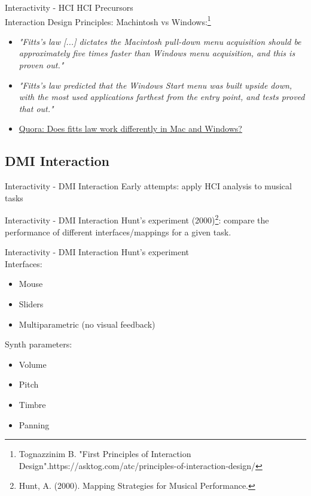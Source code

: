 \documentclass{beamer}
\begin{document}
\begin{frame}{Interactivity - HCI} 
    HCI Precursors\\
    \vspace{5mm}
    Interaction Design Principles: Machintosh vs Windows:\footnote{Tognazzinim B.  "First Principles of Interaction Design".https://asktog.com/atc/principles-of-interaction-design/}\\ 
    \begin{itemize}
        \item \textit{"Fitts’s law [...] dictates the Macintosh pull-down menu acquisition should be approximately five times faster than Windows menu acquisition, and this is proven out."}
        \item \textit{"Fitts’s law predicted that the Windows Start menu was built upside down, with the most used applications farthest from the entry point, and tests proved that out."} 
        \item \href{https://www.quora.com/Does-fitts-law-work-differently-in-Mac-and-Windows}{Quora: Does fitts law work differently in Mac and Windows?}
    \end{itemize}
\end{frame}


\subsection{DMI Interaction}

\begin{frame}{Interactivity - DMI Interaction} 
    Early attempts: apply HCI analysis to musical tasks\\
\end{frame}

\begin{frame}{Interactivity - DMI Interaction} 
    Hunt's experiment (2000)\footnote{Hunt, A. (2000). Mapping Strategies for Musical Performance.}: compare the performance of different interfaces/mappings for a given task.
\end{frame}

\begin{frame}{Interactivity - DMI Interaction} 
    Hunt's experiment\\
    \vspace{5mm}
    Interfaces:
    \begin{itemize}
        \item Mouse
        \item Sliders
        \item Multiparametric (no visual feedback)
    \end{itemize}
    Synth parameters:
    \begin{itemize}
        \item Volume
        \item Pitch
        \item Timbre
        \item Panning
    \end{itemize}
\end{frame}
\end{document}
